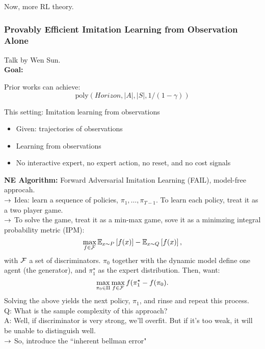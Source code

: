 Now, more RL theory.

\subsubsection{Provably Efficient Imitation Learning from Observation Alone}

Talk by Wen Sun. \\

{\bf Goal:} 

Prior works can achieve:
\[
\text{poly}(Horizon, |A|, |S|, 1/(1-\gamma))
\]

This setting: Imitation learning from observations
\begin{itemize}
    \item Given: trajectories of observations
    \item Learning from observations
    \item No interactive expert, no expert action, no reset, and no cost signals
\end{itemize}

{\bf NE Algorithm:} Forward Adversarial Imitation Learning (FAIL), model-free approcah. \\

$\rightarrow$ Idea: learn a sequence of policies, $\pi_1, \ldots, \pi_{T-1}$. To learn each policy, treat it as a two player game. \\

$\rightarrow$ To solve the game, treat it as a min-max game, sove it as a minimzing integral probability metric (IPM):
\[
\max_{f \in \mathcal{F}} \mathbb{E}_{x \sim P}\left[f(x)\right] - \mathbb{E}_{x \sim Q}\left[f(x)\right],
\]
with $\mathcal{F}$ a set of discriminators. $\pi_0$ together with the dynamic model define one agent (the generator), and $\pi_1^\star$ as the expert distribution. Then, want:
\[
\max_{\pi_0 \in \Pi} \max_{f \in \mathcal{F}}f(\pi_1^{\star} - f(\pi_0).
\]
Solving the above yields the next policy, $\pi_1$, and rinse and repeat this process. \\

Q: What is the sample complexity of this approach? \\

A: Well, if discriminator is very strong, we'll overfit. But if it's too weak, it will be unable to distinguish well. \\

$\rightarrow$ So, introduce the ``inherent bellman error"

